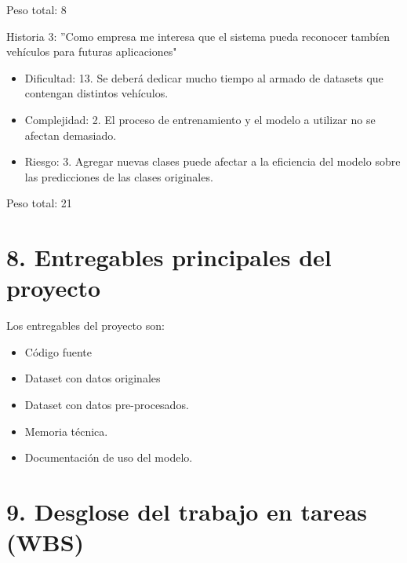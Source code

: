 \documentclass[
11pt, %
]{charter}
\begin{document}
Peso total: 8

Historia 3: ''Como empresa me interesa que el sistema pueda reconocer tambíen vehículos para futuras aplicaciones"

\begin{itemize}
	\item Dificultad: 13. Se deberá dedicar mucho tiempo al armado de datasets que contengan distintos vehículos.
	\item Complejidad: 2. El proceso de entrenamiento y el modelo a utilizar no se afectan demasiado.
	\item Riesgo: 3. Agregar nuevas clases puede afectar a la eficiencia del modelo sobre las predicciones de las clases originales.
\end{itemize}
	
Peso total: 21

\section{8. Entregables principales del proyecto}
\label{sec:entregables}

Los entregables del proyecto son:

\begin{itemize}
	\item Código fuente
	\item Dataset con datos originales
	\item Dataset con datos pre-procesados.
	\item Memoria técnica.
	\item Documentación de uso del modelo.
\end{itemize}


\section{9. Desglose del trabajo en tareas (WBS)}
\label{sec:wbs}
\end{document}
